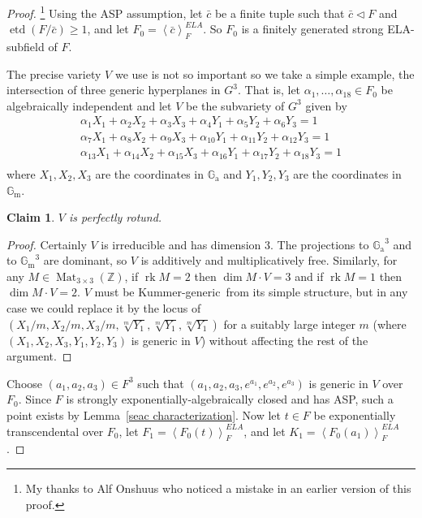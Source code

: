 \documentclass[12pt]{amsart}
\newtheorem*{claim}{Claim}
\theoremstyle{definition}
\begin{document}
\begin{proof}\footnote{My thanks to Alf Onshuus who noticed a mistake in an earlier version of this proof.}
Using the ASP assumption, let ${{\ensuremath{\bar{c}}}}$ be a finite tuple such that ${{\ensuremath{\bar{c}}}} {\ensuremath{\lhd}} F$ and $\operatorname{etd}(F/{{\ensuremath{\bar{c}}}}) {\ensuremath{\geqslant}} 1$, and let $F_0 = {\ensuremath{\left\langle {{\ensuremath{\bar{c}}}} \right\rangle}}^{ELA}_F$. So $F_0$ is a finitely generated strong ELA-subfield of $F$.

The precise variety $V$ we use is not so important so we take a simple example, the intersection of three generic hyperplanes in $G^3$. That is, let $\alpha_1, \ldots, \alpha_{18} \in F_0$ be algebraically independent and let $V$ be the subvariety of $G^3$ given by
\begin{eqnarray*}
\alpha_1 X_1 + \alpha_2 X_2  + \alpha_3 X_3 +\alpha_4 Y_1  + \alpha_5 Y_2 + \alpha_6 Y_3 = 1 \\
\alpha_7 X_1 + \alpha_8 X_2  + \alpha_9 X_3 +\alpha_{10} Y_1  + \alpha_{11} Y_2 + \alpha_{12} Y_3 = 1 \\
\alpha_{13} X_1 + \alpha_{14} X_2  + \alpha_{15} X_3 +\alpha_{16} Y_1  + \alpha_{17} Y_2 + \alpha_{18} Y_3 = 1 \\
\end{eqnarray*}
where $X_1,X_2,X_3$ are the coordinates in ${\ensuremath{\mathbb{G}_\mathrm{a}}}$ and $Y_1,Y_2,Y_3$ are the coordinates in ${\ensuremath{\mathbb{G}_\mathrm{m}}}$. 
\begin{claim}
 $V$ is perfectly rotund.
\end{claim}
\begin{proof}
Certainly $V$ is irreducible and has dimension 3. The projections to ${\ensuremath{\mathbb{G}_\mathrm{a}}}^3$ and to ${\ensuremath{\mathbb{G}_\mathrm{m}}}^3$ are dominant, so $V$ is additively and multiplicatively free. Similarly, for any $M \in \operatorname{Mat}_{3{\ensuremath{\times}} 3}({\ensuremath{\mathbb{Z}}})$, if $\operatorname{rk} M = 2$ then $\dim M\cdot V = 3$ and if $\operatorname{rk} M = 1$ then $\dim M\cdot V = 2$. $V$ must be {Kummer-generic}\ from its simple structure, but in any case we could replace it by the locus of $(X_1/m,X_2/m,X_3/m,\sqrt[m]{Y_1},\sqrt[m]{Y_1},\sqrt[m]{Y_1})$ for a suitably large integer $m$ (where $(X_1,X_2,X_3,Y_1,Y_2,Y_3)$ is generic in $V$) without affecting the rest of the argument.
\end{proof}

Choose $(a_1,a_2,a_3) \in F^3$ such that $(a_1,a_2,a_3,e^{a_1},e^{a_2},e^{a_3})$ is generic in $V$ over $F_0$. Since $F$ is strongly exponentially-algebraically closed and has ASP, such a point exists by Lemma~\ref{seac characterization}. Now let $t \in F$ be exponentially transcendental over $F_0$, let $F_1 = {\ensuremath{\left\langle {F_0(t)} \right\rangle}}_F^{ELA}$, and let $K_1 = {\ensuremath{\left\langle {F_0(a_1)} \right\rangle}}_F^{ELA}$.


\end{proof}
\end{document}
